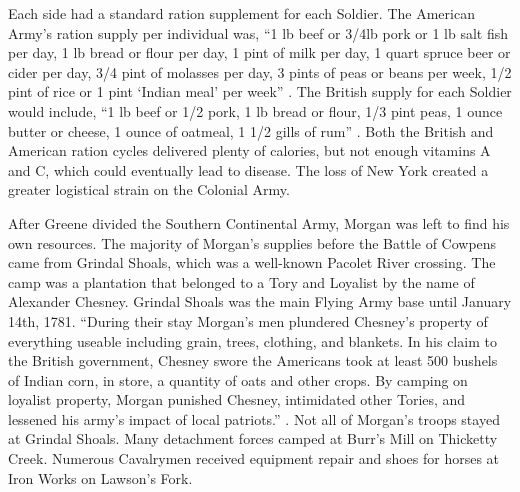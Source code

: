 Each side had a standard ration supplement for each Soldier.  The American
Army’s ration supply per individual was, “1 lb beef or 3/4lb pork or 1 lb salt
fish per day, 1 lb bread or flour per day, 1 pint of milk per day, 1 quart
spruce beer or cider per day, 3/4 pint of molasses per day, 3 pints of peas or
beans per week, 1/2 pint of rice or 1 pint ‘Indian meal’ per week”
\cite[pp.107-08]{stephenson_patriot_2007}.  The British supply for each Soldier would include, “1
lb beef or 1/2 pork, 1 lb bread or flour, 1/3 pint peas, 1 ounce butter or
cheese, 1 ounce of oatmeal, 1 1/2 gills of rum”
\cite[p.108]{stephenson_patriot_2007}.  Both the
British and American ration cycles delivered plenty of calories, but not enough
vitamins A and C, which could eventually lead to disease.  The loss of New York
created a greater logistical strain on the Colonial Army.

After Greene divided the Southern Continental Army, Morgan was left to find his
own resources.  The majority of Morgan’s supplies before the Battle of Cowpens
came from Grindal Shoals, which was a well-known Pacolet River crossing.  The
camp was a plantation that belonged to a Tory and Loyalist by the name of
Alexander Chesney.  Grindal Shoals was the main Flying Army base until January
14th, 1781.  “During their stay Morgan’s men plundered Chesney’s property of
everything useable including grain, trees, clothing, and blankets.  In his claim
to the British government, Chesney swore the Americans took at least 500 bushels
of Indian corn, in store, a quantity of oats and other crops.  By camping on
loyalist property, Morgan punished Chesney, intimidated other Tories, and
lessened his army’s impact of local patriots.” \cite[p.48]{babits_devil_2001}.  Not all of
Morgan’s troops stayed at Grindal Shoals.  Many detachment forces camped at
Burr’s Mill on Thicketty Creek.  Numerous Cavalrymen received equipment repair
and shoes for horses at Iron Works on Lawson’s Fork.

